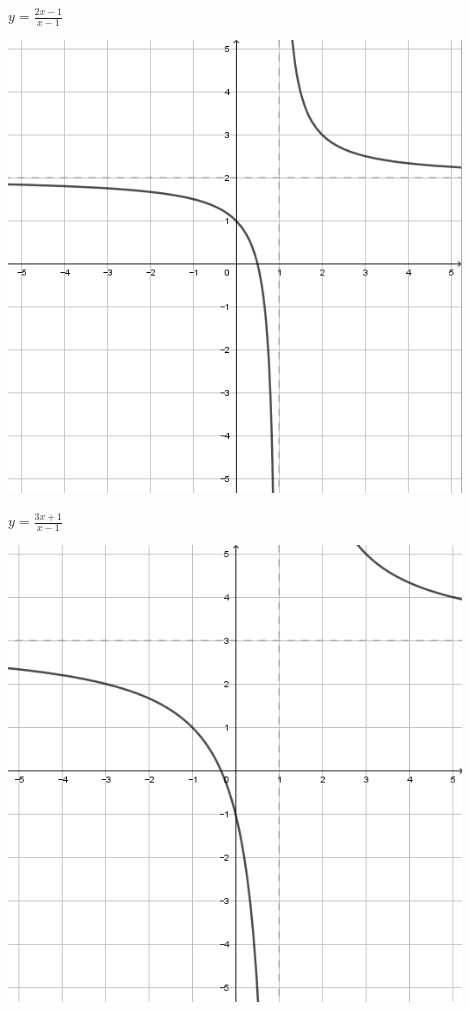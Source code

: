 \documentclass[a4paper]{oblivoir}
\begin{document}
\begin{minipage}{0.45\textwidth}\centering
\(y=\frac{2x-1}{x-1}\)
\par\bigskip\includegraphics[width=0.9\textwidth]{img/4_rational_16}
\end{minipage}
\begin{minipage}{0.45\textwidth}\centering
\(y=\frac{3x+1}{x-1}\)
\par\bigskip\includegraphics[width=0.9\textwidth]{img/4_rational_17}
\end{minipage}\bigskip\bigskip\par
\end{document}
